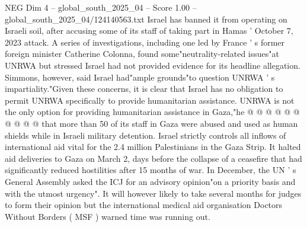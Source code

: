\begin{textsample}{NEG Dim 4 – global\_south\_2025\_04 – Score 1.00 – global\_south\_2025\_04/124140563.txt}
Israel has banned it from operating on Israeli soil, after accusing some of its staff of taking part in Hamas ' October 7, 2023 attack.
A series of investigations, including one led by France ' s former foreign minister Catherine Colonna, found some"neutrality-related issues"at UNRWA but stressed Israel had not provided evidence for its headline allegation.
Simmons, however, said Israel had"ample grounds"to question UNRWA ' s impartiality."Given these concerns, it is clear that Israel has no obligation to permit UNRWA specifically to provide humanitarian assistance.
UNRWA is not the only option for providing humanitarian assistance in Gaza,"he @ @ @ @ @ @ @ @ @ @ that more than 50 of its staff in Gaza were abused and used as human shields while in Israeli military detention.
Israel strictly controls all inflows of international aid vital for the 2.4 million Palestinians in the Gaza Strip.
It halted aid deliveries to Gaza on March 2, days before the collapse of a ceasefire that had significantly reduced hostilities after 15 months of war.
In December, the UN ' s General Assembly asked the ICJ for an advisory opinion"on a priority basis and with the utmost urgency".
It will however likely to take several months for judges to form their opinion but the international medical aid organisation Doctors Without Borders ( MSF ) warned time was running out.

\end{textsample}
